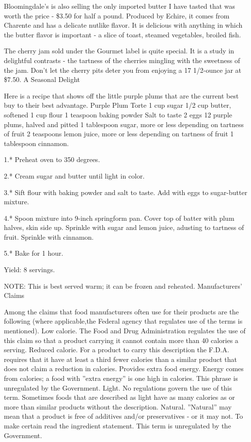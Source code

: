 Bloomingdale's is also selling the only imported butter I have tasted
that was worth the price - \$3.50 for half a pound. Produced by Echire,
it comes from Charente and has a delicate nutlike flavor. It is
delicious with anything in which the butter flavor is important - a
slice of toast, steamed vegetables, broiled fish.

The cherry jam sold under the Gourmet label is quite special. It is a
study in delightful contrasts - the tartness of the cherries mingling
with the sweetness of the jam. Don't let the cherry pits deter you from
enjoying a 17 1/2-ounce jar at \$7.50. A Seasonal Delight

Here is a recipe that shows off the little purple plums that are the
current best buy to their best advantage. Purple Plum Torte 1 cup sugar
1/2 cup butter, softened 1 cup flour 1 teaspoon baking powder Salt to
taste 2 eggs 12 purple plums, halved and pitted 1 tablespoon sugar, more
or less depending on tartness of fruit 2 teaspoons lemon juice, more or
less depending on tartness of fruit 1 tablespoon cinnamon.

1.* Preheat oven to 350 degrees.

2.* Cream sugar and butter until light in color.

3.* Sift flour with baking powder and salt to taste. Add with eggs to
sugar-butter mixture.

4.* Spoon mixture into 9-inch springform pan. Cover top of batter with
plum halves, skin side up. Sprinkle with sugar and lemon juice, adusting
to tartness of fruit. Sprinkle with cinnamon.

5.* Bake for 1 hour.

Yield: 8 servings.

NOTE: This is best served warm; it can be frozen and reheated.
Manufacturers' Claims

Among the claims that food manufacturers often use for their products
are the following (where applicable,the Federal agency that regulates
use of the terms is mentioned). Low calorie. The Food and Drug
Administration regulates the use of this claim so that a product
carrying it cannot contain more than 40 calories a serving. Reduced
calorie. For a product to carry this description the F.D.A. requires
that it have at least a third fewer calories than a similar product that
does not claim a reduction in calories. Provides extra food energy.
Energy comes from calories; a food with ''extra energy'' is one high in
calories. This phrase is unregulated by the Government. Light. No
regulations govern the use of this term. Sometimes foods that are
described as light have as many calories as or more than similar
products without the description. Natural. ''Natural'' may mean that a
product is free of additives and/or preservatives - or it may not. To
make certain read the ingredient statement. This term is unregulated by
the Government.

